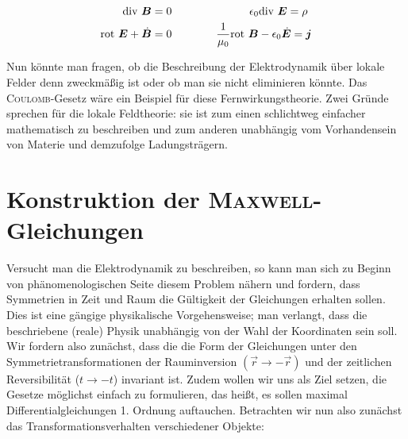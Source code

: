 \begin{align*}
\text{div } \bm{B} &= 0 \qquad\qquad\qquad\quad \epsilon_0\text{div } \bm{E} = \rho \\
\text{rot } \bm{E} + \dot{\bm{B}} &= 0 \qquad\qquad \frac{1}{\mu_0}\text{rot} \ \bm{B} - \epsilon_0\dot{\bm{E}} = \bm{j}
\end{align*}


Nun könnte man fragen, ob die  Beschreibung der Elektrodynamik über lokale Felder denn zweckmäßig ist oder ob man sie nicht eliminieren könnte. Das \textsc{Coulomb}-Gesetz wäre ein Beispiel für diese Fernwirkungstheorie. Zwei Gründe sprechen für die lokale Feldtheorie: sie ist zum einen schlichtweg einfacher mathematisch zu beschreiben und zum anderen unabhängig vom Vorhandensein von Materie und demzufolge Ladungsträgern.

\section{Konstruktion der \textsc{Maxwell}-Gleichungen}
Versucht man die Elektrodynamik zu beschreiben, so kann man sich zu Beginn von phänomenologischen Seite diesem Problem nähern und fordern, dass Symmetrien in Zeit und Raum die Gültigkeit der Gleichungen erhalten sollen. Dies ist eine gängige physikalische Vorgehensweise; man verlangt, dass die beschriebene (reale) Physik unabhängig von der Wahl der Koordinaten sein soll.
Wir fordern also zunächst, dass die die Form der Gleichungen unter den Symmetrietransformationen der Rauminversion $(\vec{r}\rightarrow-\vec{r})$ und der zeitlichen Reversibilität ($t\rightarrow-t$) invariant ist. Zudem wollen wir uns als Ziel setzen, die Gesetze möglichst einfach zu formulieren, das heißt, es sollen maximal Differentialgleichungen 1. Ordnung auftauchen.
Betrachten wir nun also zunächst das Transformationsverhalten verschiedener Objekte:\ \\
\ \\


